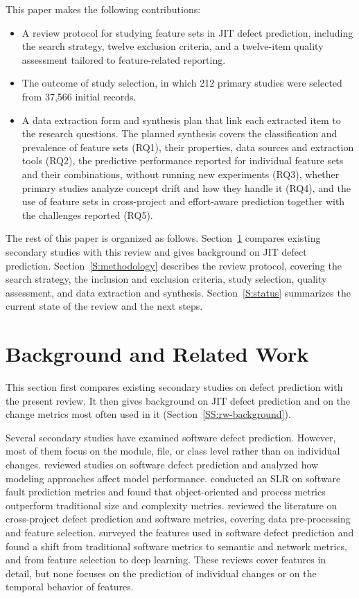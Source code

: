 \documentclass[sigconf,review]{acmart}
\begin{document}
\noindent This paper makes the following contributions:
\begin{itemize}
    \item A review protocol for studying feature sets in JIT defect prediction, including the search strategy, twelve exclusion criteria, and a twelve-item quality assessment tailored to feature-related reporting.
    \item The outcome of study selection, in which 212 primary studies were selected from 37,566 initial records.
    \item A data extraction form and synthesis plan that link each extracted item to the research questions. The planned synthesis covers the classification and prevalence of feature sets (RQ1), their properties, data sources and extraction tools (RQ2), the predictive performance reported for individual feature sets and their combinations, without running new experiments (RQ3), whether primary studies analyze concept drift and how they handle it (RQ4), and the use of feature sets in cross-project and effort-aware prediction together with the challenges reported (RQ5).
\end{itemize}

The rest of this paper is organized as follows. Section~\ref{S:related-works} compares existing secondary studies with this review and gives background on JIT defect prediction. Section~\ref{S:methodology} describes the review protocol, covering the search strategy, the inclusion and exclusion criteria, study selection, quality assessment, and data extraction and synthesis. Section~\ref{S:status} summarizes the current state of the review and the next steps.

\section{Background and Related Work}
\label{S:related-works}

This section first compares existing secondary studies on defect prediction with the present review. It then gives background on JIT defect prediction and on the change metrics most often used in it (Section~\ref{SS:rw-background}).

Several secondary studies have examined software defect prediction. However, most of them focus on the module, file, or class level rather than on individual changes. \citet{hall2012systematic} reviewed studies on software defect prediction and analyzed how modeling approaches affect model performance. \citet{radjenovic2013software} conducted an SLR on software fault prediction metrics and found that object-oriented and process metrics outperform traditional size and complexity metrics. \citet{pal2022cross} reviewed the literature on cross-project defect prediction and software metrics, covering data pre-processing and feature selection. \citet{qiu2025survey} surveyed the features used in software defect prediction and found a shift from traditional software metrics to semantic and network metrics, and from feature selection to deep learning. These reviews cover features in detail, but none focuses on the prediction of individual changes or on the temporal behavior of features.
\end{document}
